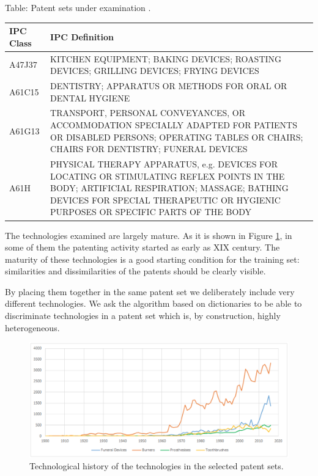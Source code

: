 \documentclass[]{book}
\begin{document}
Table: \label{tab:dicpatents} Patent sets under examination .

\begin{tabular}{l|l}
\hline
IPC Class & IPC Definition\\
\hline
A47J37 & KITCHEN EQUIPMENT; BAKING DEVICES; ROASTING DEVICES; GRILLING DEVICES; FRYING DEVICES\\
\hline
A61C15 & DENTISTRY; APPARATUS OR METHODS FOR ORAL OR DENTAL HYGIENE\\
\hline
A61G13 & TRANSPORT, PERSONAL CONVEYANCES, OR ACCOMMODATION SPECIALLY ADAPTED FOR PATIENTS OR DISABLED PERSONS; OPERATING TABLES OR CHAIRS; CHAIRS FOR DENTISTRY; FUNERAL DEVICES\\
\hline
A61H & PHYSICAL THERAPY APPARATUS, e.g. DEVICES FOR LOCATING OR STIMULATING REFLEX POINTS IN THE BODY; ARTIFICIAL RESPIRATION; MASSAGE; BATHING DEVICES FOR SPECIAL THERAPEUTIC OR HYGIENIC PURPOSES OR SPECIFIC PARTS OF THE BODY\\
\hline
\end{tabular}

The technologies examined are largely mature. As it is shown in Figure
\ref{fig:dicttrendsipc}, in some of them the patenting activity started
as early as XIX century. The maturity of these technologies is a good
starting condition for the training set: similarities and
dissimilarities of the patents should be clearly visible.

By placing them together in the same patent set we deliberately include
very different technologies. We ask the algorithm based on dictionaries
to be able to discriminate technologies in a patent set which is, by
construction, highly heterogeneous.

\begin{figure}

{\centering \includegraphics[width=0.8\linewidth]{_bookdown_files/figures/dicttrendsipc} 

}

\caption{Technological history of the technologies in the selected patent sets.}\label{fig:dicttrendsipc}
\end{figure}
\end{document}
